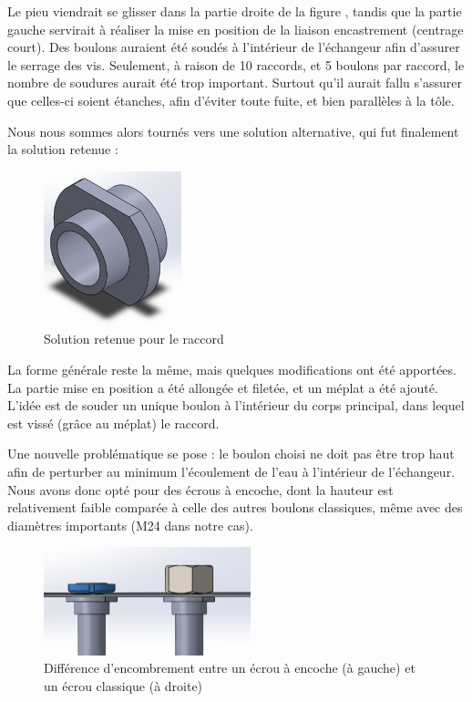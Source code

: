 \documentclass[../PS6_RapportFinal.tex]{subfiles}
\begin{document}
Le pieu viendrait se glisser dans la partie droite de la figure , tandis que la partie gauche servirait à réaliser la mise en position de la liaison encastrement (centrage court). Des boulons auraient été soudés à l'intérieur de l'échangeur afin d'assurer le serrage des vis. Seulement, à raison de 10 raccords, et 5 boulons par raccord, le nombre de soudures aurait été trop important. Surtout qu'il aurait fallu s'assurer que celles-ci soient étanches, afin d'éviter toute fuite, et bien parallèles à la tôle.


Nous nous sommes alors tournés vers une solution alternative, qui fut finalement la solution retenue :

\begin{figure}[!h]
\begin{center}
\includegraphics[width=4cm]{3_1_Raccord_final_1.png}
\caption{Solution retenue pour le raccord}
\end{center}
\end{figure}

La forme générale reste la même, mais quelques modifications ont été apportées. La partie mise en position a été allongée et filetée, et un méplat a été ajouté. L'idée est de souder un unique boulon à l'intérieur du corps principal, dans lequel est vissé (grâce au méplat) le raccord.

Une nouvelle problématique se pose : le boulon choisi ne doit pas être trop haut afin de perturber au minimum l'écoulement de l'eau à l'intérieur de l'échangeur. Nous avons donc opté pour des écrous à encoche, dont la hauteur est relativement faible comparée à celle des autres boulons classiques, même avec des diamètres importants (M24 dans notre cas). %


\begin{figure}[!h]
\begin{center}
\includegraphics[width=6cm]{3_1_Ecrou_pieux.png}
\caption{Différence d'encombrement entre un écrou à encoche (à gauche) et un écrou classique (à droite)}
\end{center}
\end{figure}
\end{document}
